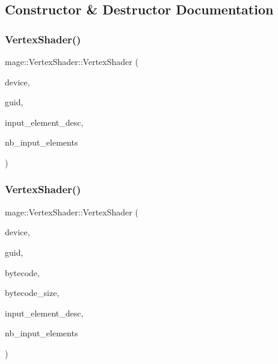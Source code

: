 \subsection{Constructor \& Destructor Documentation}
\hypertarget{classmage_1_1_vertex_shader_ad3ca2671c8690a886f99a99235deda8b}{}\label{classmage_1_1_vertex_shader_ad3ca2671c8690a886f99a99235deda8b} 
\subsubsection{\texorpdfstring{Vertex\+Shader()}{VertexShader()}\hspace{0.1cm}{\footnotesize\ttfamily [1/4]}}
{\footnotesize\ttfamily mage\+::\+Vertex\+Shader\+::\+Vertex\+Shader (\begin{DoxyParamCaption}\item[{I\+D3\+D11\+Device2 \&}]{device,  }\item[{const wstring \&}]{guid,  }\item[{const D3\+D11\+\_\+\+I\+N\+P\+U\+T\+\_\+\+E\+L\+E\+M\+E\+N\+T\+\_\+\+D\+E\+SC $\ast$}]{input\+\_\+element\+\_\+desc,  }\item[{uint32\+\_\+t}]{nb\+\_\+input\+\_\+elements }\end{DoxyParamCaption})}

\hypertarget{classmage_1_1_vertex_shader_a29eea284f609c5bbefa9f67238bc6c5a}{}\label{classmage_1_1_vertex_shader_a29eea284f609c5bbefa9f67238bc6c5a} 
\subsubsection{\texorpdfstring{Vertex\+Shader()}{VertexShader()}\hspace{0.1cm}{\footnotesize\ttfamily [2/4]}}
{\footnotesize\ttfamily mage\+::\+Vertex\+Shader\+::\+Vertex\+Shader (\begin{DoxyParamCaption}\item[{I\+D3\+D11\+Device2 \&}]{device,  }\item[{const wstring \&}]{guid,  }\item[{const void $\ast$}]{bytecode,  }\item[{S\+I\+Z\+E\+\_\+T}]{bytecode\+\_\+size,  }\item[{const D3\+D11\+\_\+\+I\+N\+P\+U\+T\+\_\+\+E\+L\+E\+M\+E\+N\+T\+\_\+\+D\+E\+SC $\ast$}]{input\+\_\+element\+\_\+desc,  }\item[{uint32\+\_\+t}]{nb\+\_\+input\+\_\+elements }\end{DoxyParamCaption})}

